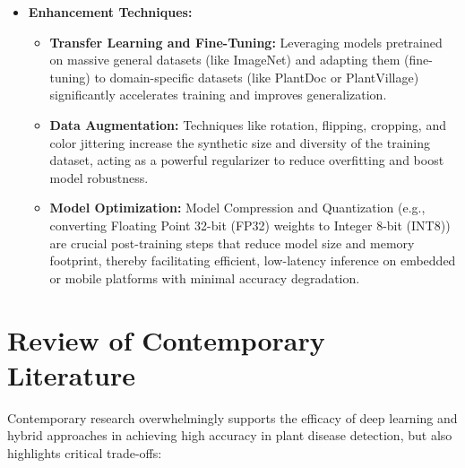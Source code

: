 \documentclass[12pt, a4paper]{report}
\begin{document}
\begin{itemize}
    \item \textbf{Enhancement Techniques:}
    \begin{itemize}
        \item \textbf{Transfer Learning and Fine-Tuning:} Leveraging models pretrained on massive general datasets (like ImageNet) and adapting them (fine-tuning) to domain-specific datasets (like PlantDoc or PlantVillage) significantly accelerates training and improves generalization.
        \item \textbf{Data Augmentation:} Techniques like rotation, flipping, cropping, and color jittering increase the synthetic size and diversity of the training dataset, acting as a powerful regularizer to reduce overfitting and boost model robustness.
        \item \textbf{Model Optimization:} Model Compression and Quantization (e.g., converting Floating Point 32-bit (FP32) weights to Integer 8-bit (INT8)) are crucial post-training steps that reduce model size and memory footprint, thereby facilitating efficient, low-latency inference on embedded or mobile platforms with minimal accuracy degradation.
    \end{itemize}
\end{itemize}



\section{Review of Contemporary Literature}
\label{sec:literature_review}
Contemporary research overwhelmingly supports the efficacy of deep learning and hybrid approaches in achieving high accuracy in plant disease detection, but also highlights critical trade-offs:
\end{document}
